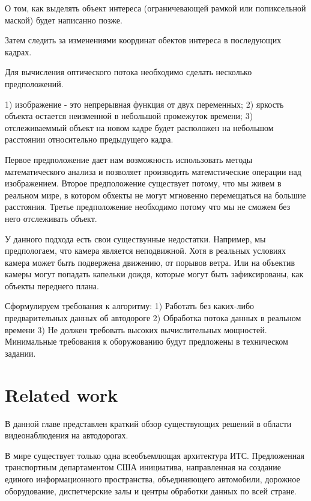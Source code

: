 \documentclass[12pt,a4paper,oneside,titlepage]{article}
\begin{document}
О том, как выделять объект интереса (ограничевающей рамкой или попиксельной маской) будет написанно позже.

Затем следить за изменениями координат обектов интереса в последующих кадрах.





Для вычисления оптического потока необходимо сделать несколько предположений.

1) изображение - это непрерывная функция от двух переменных;
2) яркость объекта остается неизменной в небольшой промежуток времени;
3) отслеживаеммый объект на новом кадре будет расположен на небольшом расстоянии относительно предыдущего кадра.

Первое предположение дает нам возможность использовать методы математического анализа и позволяет производить матемстические операции над изображением.
Второе предположение существует потому, что мы живем в реальном мире, в котором  обхекты не могут мгновенно перемещаться на большие расстояния.
Третье предположение необходимо потому что мы не сможем без него отслеживать объект.




У данного подхода есть свои существунные недостатки.
Например, мы предпологаем, что камера является неподвижной.
Хотя в реальных условиях камера может быть подвержена движению, от порывов ветра.
Или на объектив камеры могут попадать капельки дождя, которые могут быть зафиксированы, как объекты переднего плана.





Сформулируем требования к алгоритму:
1) Работать без каких-либо предварительных данных об автодороге
2) Обработка потока данных в реальном времени
3) Не должен требовать высоких вычислительных мощностей. Минимальные требования к оборужованию будут предложены в техническом задании.


\newpage
\section*{Related work}
В данной главе представлен краткий обзор существующих решений в области видеонаблюдения на автодорогах.

В мире существует только одна всеобъемлющая архитектура ИТС. Предложенная транспортным департаментом США инициатива, направленная на создание единого информационного пространства, объединяющего автомобили, дорожное оборудование, диспетчерские залы и центры обработки данных по всей стране. 
\end{document}
